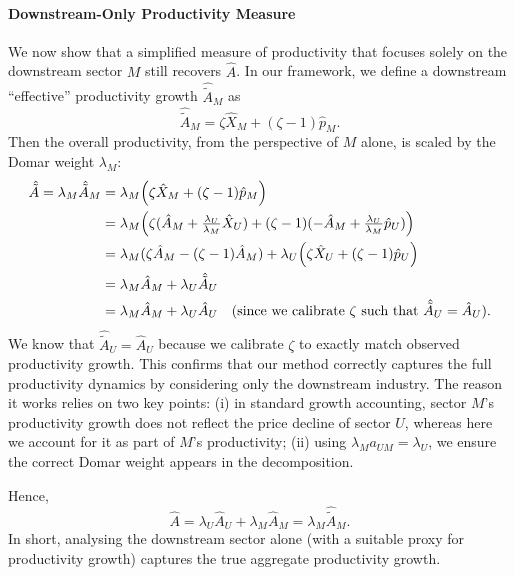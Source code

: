 \documentclass[11pt]{article}
\begin{document}
\paragraph{Downstream-Only Productivity Measure} We now show that a simplified measure of productivity that focuses solely on the downstream sector $M$ still recovers $\hat{A}$. In our framework, we define a downstream ``effective'' productivity growth $\hat{\tilde{A}}_M$ as
\begin{equation*}
    \hat{\tilde{A}}_M =  \zeta \hat{X}_M + (\zeta - 1) \hat{p}_M.
\end{equation*}
Then the overall productivity, from the perspective of $M$ alone, is scaled by the Domar weight $\lambda_M$:
\begin{equation}
    \begin{aligned}
    \hat{\tilde{A}}=\lambda_M  \hat{\tilde{A}}_M 
    &= \lambda_M\Bigl(\zeta \hat{X}_M + (\zeta-1) \hat{p}_M\Bigr)\\
    &= \lambda_M\Bigl(\zeta(\hat{A}_M+ \tfrac{\lambda_U}{\lambda_M} \hat{X}_U )
        +  (\zeta-1) (-\hat{A}_M+\tfrac{\lambda_U}{\lambda_M} \hat{p}_U)\Bigr)\\
    &= \lambda_M (\zeta\hat{A}_M-(\zeta-1)\hat{A}_M)+\lambda_U\Bigl(\zeta \hat{X}_U + (\zeta-1) \hat{p}_U\Bigr)\\
    &= \lambda_M \hat{A}_M+\lambda_U \hat{\tilde{A}}_U\\
    &=\lambda_M \hat{A}_M+\lambda_U \hat{A}_U\quad(\text{since we calibrate }\zeta\text{ such that }\hat{\tilde{A}}_U=\hat{A}_U).
\end{aligned}
\end{equation}
We know that $\hat{\tilde{A}}_U = \hat{A}_U$ because we calibrate $\zeta$ to exactly match observed productivity growth.
This confirms that our method correctly captures the full productivity dynamics by considering only the downstream industry. The reason it works relies on two key points: (i) in standard growth accounting, sector $M$'s productivity growth does not reflect the price decline of sector $U$, whereas here we account for it as part of $M$'s productivity; (ii) using $\lambda_M a_{UM} = \lambda_U$, we ensure the correct Domar weight appears in the decomposition. 

Hence,
\begin{equation}
      \hat{A}  =  \lambda_U \hat{A}_U+\lambda_M \hat{A}_M 
     =  \lambda_M \hat{\tilde{A}}_M.
\end{equation}
In short, analysing the downstream sector alone (with a suitable proxy for productivity growth) captures the true aggregate productivity growth.
\end{document}
